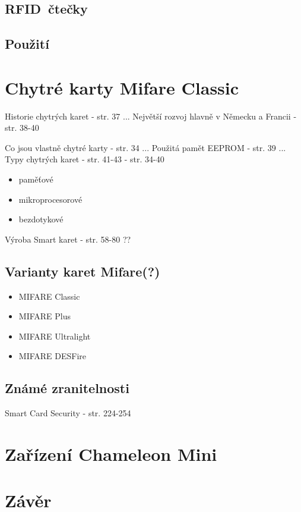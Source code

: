 \section{RFID\ čtečky}

\section{Použití}

\chapter{Chytré karty Mifare Classic}
\label{chytre_karty_mifare_classic}

Historie chytrých karet \cite{Smart_card_handbook} {-} str. 37 ...
Největší rozvoj hlavně v Německu a Francii\cite{Smart_card_handbook} {-} str. 38-40
\par 
Co jsou vlastně chytré karty \cite{Smart_Cards_Tokens_Security} {-} str. 34 ... 
Použitá pamět EEPROM \cite{Smart_card_handbook} {- str. 39} ... 
Typy chytrých karet\cite{Smart_card_handbook}{ - str. 41-43} \cite{Smart_Cards_Tokens_Security}{ - str. 34-40}

\begin{itemize}
    \item paměťové
    \item mikroprocesorové
    \item bezdotykové
\end{itemize}

\par
Výroba Smart karet \cite{Smart_Cards_Tokens_Security}{ - str. 58-80} ??

\section{Varianty karet Mifare(?)}

\begin{itemize}
  \item MIFARE Classic 
  \item MIFARE Plus
  \item MIFARE Ultralight 
  \item MIFARE DESFire
\end{itemize}

\section{Známé zranitelnosti}

Smart Card Security \cite{Smart_Cards_Tokens_Security}{ - str. 224-254}

\chapter{Zařízení Chameleon Mini}
\label{zarizeni_chameleon_mini}







\chapter{Závěr}
\label{zaver}


